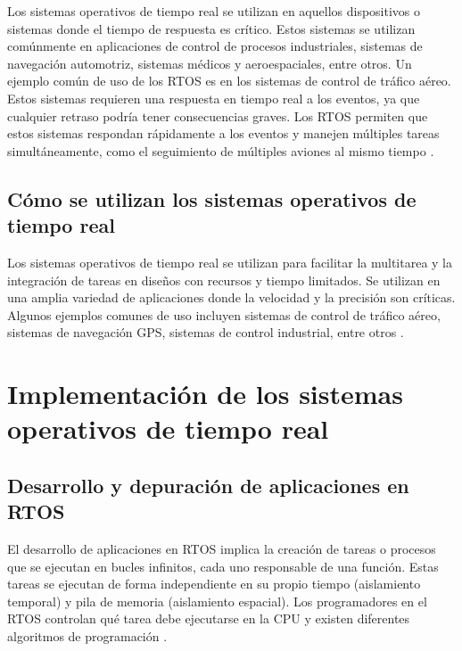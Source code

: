 \documentclass{article}
\begin{document}
Los sistemas operativos de tiempo real se utilizan en aquellos dispositivos o sistemas donde el tiempo de respuesta
es crítico. Estos sistemas se utilizan comúnmente en aplicaciones de control de procesos industriales, sistemas de
navegación automotriz, sistemas médicos y aeroespaciales, entre otros. Un ejemplo común de uso de los RTOS es en
los sistemas de control de tráfico aéreo. Estos sistemas requieren una respuesta en tiempo real a los eventos, ya que
cualquier retraso podría tener consecuencias graves. Los RTOS permiten que estos sistemas respondan rápidamente
a los eventos y manejen múltiples tareas simultáneamente, como el seguimiento de múltiples aviones al mismo
tiempo \cite{ref2} \cite{ref8}.


\subsection{Cómo se utilizan los sistemas operativos de tiempo real}

Los sistemas operativos de tiempo real se utilizan para facilitar la multitarea y la integración de tareas en diseños
con recursos y tiempo limitados. Se utilizan en una amplia variedad de aplicaciones donde la velocidad y la precisión
son críticas. Algunos ejemplos comunes de uso incluyen sistemas de control de tráfico aéreo, sistemas de navegación
GPS, sistemas de control industrial, entre otros  \cite{ref2} \cite{ref5} \cite{ref6} \cite{ref8}.


\newpage

\section{Implementación de los sistemas operativos de tiempo real}

\subsection{Desarrollo y depuración de aplicaciones en RTOS}
El desarrollo de aplicaciones en RTOS implica la creación de tareas o procesos que se ejecutan en bucles infinitos, cada 
uno responsable de una función. Estas tareas se ejecutan de forma independiente en su propio tiempo (aislamiento temporal) 
y pila de memoria (aislamiento espacial). Los programadores en el RTOS controlan qué tarea debe ejecutarse en la CPU y existen 
diferentes algoritmos de programación \cite{ref1}.
\end{document}
